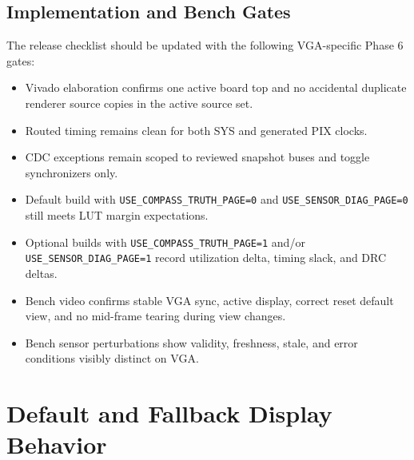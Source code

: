 \documentclass{article}
\newcommand{\param}[1]{\begingroup\nolinkurl{#1}\endgroup}
\begin{document}
\subsection{Implementation and Bench Gates}

The release checklist should be updated with the following VGA-specific Phase 6
gates:

\begin{itemize}
  \item Vivado elaboration confirms one active board top and no accidental
        duplicate renderer source copies in the active source set.
  \item Routed timing remains clean for both SYS and generated PIX clocks.
  \item CDC exceptions remain scoped to reviewed snapshot buses and toggle
        synchronizers only.
  \item Default build with \param{USE_COMPASS_TRUTH_PAGE=0} and
        \param{USE_SENSOR_DIAG_PAGE=0} still meets LUT margin expectations.
  \item Optional builds with \param{USE_COMPASS_TRUTH_PAGE=1} and/or
        \param{USE_SENSOR_DIAG_PAGE=1} record utilization delta, timing slack,
        and DRC deltas.
  \item Bench video confirms stable VGA sync, active display, correct reset
        default view, and no mid-frame tearing during view changes.
  \item Bench sensor perturbations show validity, freshness, stale, and error
        conditions visibly distinct on VGA.
\end{itemize}

\section{Default and Fallback Display Behavior}
\end{document}
